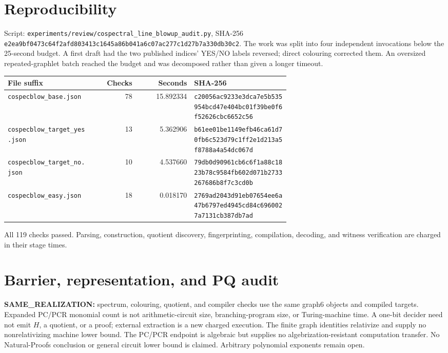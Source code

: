 \documentclass[11pt]{article}
\begin{document}
\section{Reproducibility}
Script: \texttt{experiments/review/cospectral\_line\_blowup\_audit.py}, SHA-256
\texttt{e2ea9bf0473c64f2afd803413c1645a86b041a6c07ac277c1d27b7a330db30c2}.
The work was split into four independent invocations below the 25-second budget.  A
first draft had the two published indices' YES/NO labels reversed; direct colouring
corrected them.  An oversized repeated-graphlet batch reached the budget and was
decomposed rather than given a longer timeout.
\begin{longtable}{p{0.30\linewidth}rrp{0.34\linewidth}}
\toprule File suffix & Checks & Seconds & SHA-256 \\
\midrule
\texttt{cospecblow\_base.json} & 78 & 15.892334 &
\texttt{c20056ac9233e3dca7e5b535954bcd47e404bc01f39be0f6f52626cbc6652c56}\\
\texttt{cospecblow\_target\_yes.json} & 13 & 5.362906 &
\texttt{b61ee01be1149efb46ca61d70fb6c523d79c1ff2e1d213a5f8788a4a54dc067d}\\
\texttt{cospecblow\_target\_no.json} & 10 & 4.537660 &
\texttt{79db0d90961cb6c6f1a88c1823b78c9584fb602d071b2733267686b8f7c3cd0b}\\
\texttt{cospecblow\_easy.json} & 18 & 0.018170 &
\texttt{2769ad2043d91eb07654ee6a47b6797ed4945cd84c6960027a7131cb387db7ad}\\
\bottomrule
\end{longtable}
All 119 checks passed.  Parsing, construction, quotient discovery, fingerprinting,
compilation, decoding, and witness verification are charged in their stage times.

\section{Barrier, representation, and PQ audit}
\textbf{SAME\_REALIZATION:} spectrum, colouring, quotient, and compiler checks use the
same graph6 objects and compiled targets.  Expanded PC/PCR monomial count is not
arithmetic-circuit size, branching-program size, or Turing-machine time.  A one-bit
decider need not emit $H$, a quotient, or a proof; external extraction is a new charged
execution.  The finite graph identities relativize and supply no nonrelativizing
machine lower bound.  The PC/PCR endpoint is algebraic but supplies no
algebrization-resistant computation transfer.  No Natural-Proofs conclusion or
general circuit lower bound is claimed.  Arbitrary polynomial exponents remain open.
\end{document}
